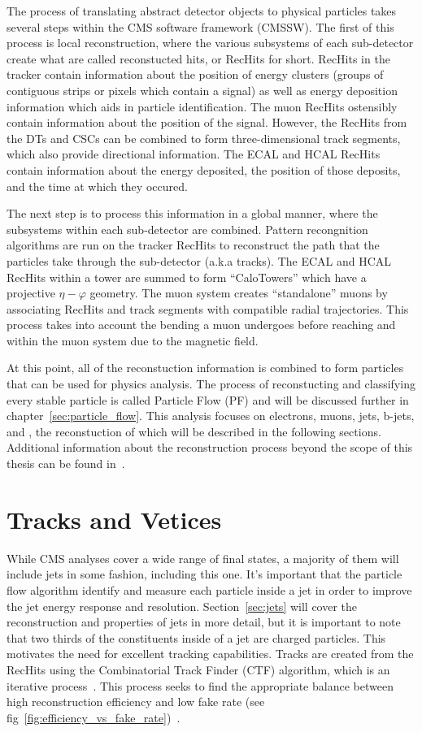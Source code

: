 The process of translating abstract detector objects to physical particles takes several steps within the CMS software framework (CMSSW).
The first of this process is local reconstruction, where the various subsystems of each sub-detector create what are called reconstucted hits, or RecHits for short.
RecHits in the tracker contain information about the position of energy clusters (groups of contiguous strips or pixels which contain a signal) as well as energy deposition information which aids in particle identification.
The muon RecHits ostensibly contain information about the position of the signal.
However, the RecHits from the DTs and CSCs can be combined to form three-dimensional track segments, which also provide directional information.
The ECAL and HCAL RecHits contain information about the energy deposited, the position of those deposits, and the time at which they occured.

The next step is to process this information in a global manner, where the subsystems within each sub-detector are combined.
Pattern recongnition algorithms are run on the tracker RecHits to reconstruct the path that the particles take through the sub-detector (a.k.a tracks).
The ECAL and HCAL RecHits within a tower are summed to form ``CaloTowers'' which have a projective $\eta-\varphi$ geometry.
The muon system creates ``standalone'' muons by associating RecHits and track segments with compatible radial trajectories.
This process takes into account the bending a muon undergoes before reaching and within the muon system due to the magnetic field.

At this point, all of the reconstuction information is combined to form particles that can be used for physics analysis.
The process of reconstucting and classifying every stable particle is called Particle Flow (PF) and will be discussed further in chapter~\ref{sec:particle_flow}.
This analysis focuses on electrons, muons, jets, b-jets, and \ETslash, the reconstuction of which will be described in the following sections.
Additional information about the reconstruction process beyond the scope of this thesis can be found in~\cite{TDR-software}.

\section{Tracks and Vetices}
\label{sec:tracks_and_vertices}

While CMS analyses cover a wide range of final states, a majority of them will include jets in some fashion, including this one.
It's important that the particle flow algorithm identify and measure each particle inside a jet in order to improve the jet energy response and resolution.
Section~\ref{sec:jets} will cover the reconstruction and properties of jets in more detail, but it is important to note that two thirds of the constituents inside of a jet are charged particles.
This motivates the need for excellent tracking capabilities.
Tracks are created from the RecHits using the Combinatorial Track Finder (CTF) algorithm, which is an iterative process~\cite{TRK-11-001}.
This process seeks to find the appropriate balance between high reconstruction efficiency and low fake rate (see fig~\ref{fig:efficiency_vs_fake_rate})~\cite{CMS-PAS-PFT-09-001}.

